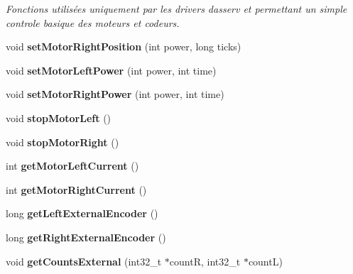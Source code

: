 \begin{DoxyCompactItemize}
\begin{DoxyCompactList}\small\item\em Fonctions utilisées uniquement par les drivers d\textquotesingle{}asserv et permettant un simple controle basique des moteurs et codeurs. \end{DoxyCompactList}\item 
\mbox{\label{classAsservN_ad0bd139b4905d99cc9d0aa36f79205d2}} 
void {\bfseries set\+Motor\+Right\+Position} (int power, long ticks)
\item 
\mbox{\label{classAsservN_a58b06f1946e8fef92d1f6dac6e6b6812}} 
void {\bfseries set\+Motor\+Left\+Power} (int power, int time)
\item 
\mbox{\label{classAsservN_a6cd6dea6f8d3d7327000cafa4e146a79}} 
void {\bfseries set\+Motor\+Right\+Power} (int power, int time)
\item 
\mbox{\label{classAsservN_ab2151d7dbb394e7b601ba5e6c097673e}} 
void {\bfseries stop\+Motor\+Left} ()
\item 
\mbox{\label{classAsservN_a2c857e3229767323dcd203d65963a4f7}} 
void {\bfseries stop\+Motor\+Right} ()
\item 
\mbox{\label{classAsservN_a059867ab5426b4309b1673c9252d207d}} 
int {\bfseries get\+Motor\+Left\+Current} ()
\item 
\mbox{\label{classAsservN_a58eb2d1d64a6798440bcf1e557ec2a57}} 
int {\bfseries get\+Motor\+Right\+Current} ()
\item 
\mbox{\label{classAsservN_a89a94c0eff3b0b84cd58c2f8444cbe16}} 
long {\bfseries get\+Left\+External\+Encoder} ()
\item 
\mbox{\label{classAsservN_aa629c55c665e057e06eb7aa655ae4d7f}} 
long {\bfseries get\+Right\+External\+Encoder} ()
\item 
\mbox{\label{classAsservN_a07cfcf79b3a0c82c3bf7183b724e7b19}} 
void {\bfseries get\+Counts\+External} (int32\+\_\+t $\ast$countR, int32\+\_\+t $\ast$countL)
\item 

\end{DoxyCompactItemize}
